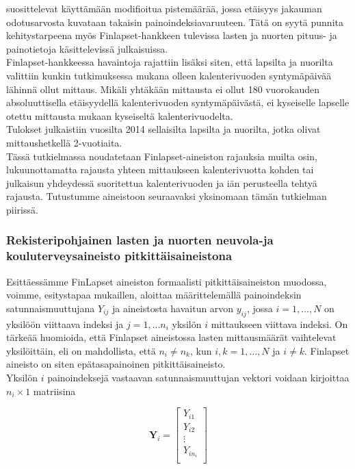 \documentclass[finnish]{docopts}
\begin{document}
\cite{flegal13} suosittelevat käyttämään modifioitua pistemäärää, jossa etäisyys jakauman odotusarvosta kuvataan takaisin painoindeksiavaruuteen. Tätä on syytä punnita kehitystarpeena myös Finlapset-hankkeen tulevissa lasten ja nuorten pituus- ja painotietoja käsittelevissä julkaisuissa. \\

Finlapset-hankkeessa havaintoja rajattiin lisäksi siten, että lapsilta ja nuorilta valittiin kunkin tutkimuksessa mukana olleen kalenterivuoden syntymäpäivää lähinnä ollut mittaus. Mikäli yhtäkään mittausta ei ollut 180 vuorokauden absoluuttisella etäisyydellä kalenterivuoden syntymäpäivästä, ei kyseiselle lapselle otettu mittausta mukaan kyseiseltä kalenterivuodelta. \\

Tulokset julkaistiin vuosilta 2014 sellaisilta lapsilta ja nuorilta, jotka olivat mittaushetkellä 2-vuotiaita. \\

Tässä tutkielmassa noudatetaan Finlapset-aineiston rajauksia muilta osin, lukuunottamatta rajausta yhteen mittaukseen kalenterivuotta kohden tai julkaisun yhdeydessä suoritettua kalenterivuoden ja iän perusteella tehtyä rajausta. Tutustumme aineistoon seuraavaksi yksinomaan tämän tutkielman piirissä.\\

\subsubsection{Rekisteripohjainen lasten ja nuorten neuvola-ja kouluterveysaineisto pitkittäisaineistona}
\label{ssb:rekpitkittais}

Esittäessämme FinLapset aineiston formaalisti pitkittäisaineiston muodossa, voimme, \cite{fitzmaurice11} esitystapaa mukaillen, aloittaa määrittelemällä painoindeksin satunnaismuuttujana $Y_{ij}$ ja aineistosta havaitun arvon $y_{ij}$, jossa $i = 1, \dots, N$ on yksilöön viittaava indeksi ja $j = 1, \dots n_i$ yksilön $i$ mittaukseen viittava indeksi. On tärkeää huomioida, että Finlapset aineistossa lasten mittausmäärät vaihtelevat yksilöittäin, eli on mahdollista, että $n_i \neq n_k$, kun $i,k = 1,\dots, N$ ja $i \neq k$. Finlapset aineisto on siten epätasapainoinen pitkittäisaineisto.\\

Yksilön $i$ painoindeksejä vastaavan satunnaismuuttujan vektori voidaan kirjoittaa $n_i \times 1$ matriisina

$$
\bm{Y}_i = 
\begin{bmatrix}
Y_{i1} \\
Y_{i2} \\
\vdots \\
Y_{in_i} \\
\end{bmatrix}
$$
\end{document}
